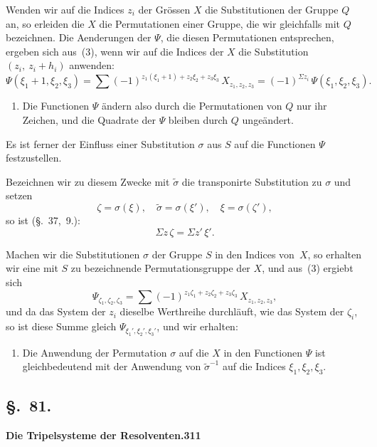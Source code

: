 \documentclass[12pt,a4paper]{article}
\begin{document}
Wenden wir auf die Indices $z_i$ der Gr\"ossen $X$ die Substitutionen der Gruppe $Q$ an, so erleiden die $X$ die Permutationen einer Gruppe, die wir gleichfalls mit $Q$ bezeichnen. Die Aenderungen der $\Psi$, die diesen Permutationen entsprechen, ergeben sich aus~(3), wenn wir auf die Indices der $X$ die Substitution $(z_i,\ z_i+h_i)$ anwenden:
\begin{equation}
\tag{4}
\Psi(\xi_1+1,\xi_2,\xi_3) = \sum (-1)^{z_1(\xi_1+1)+z_2\xi_2+z_3\xi_3}\,X_{z_1,z_2,z_3} = (-1)^{\Sigma z_i}\,\Psi(\xi_1,\xi_2,\xi_3).
\end{equation}

\begin{enumerate}
\item[1.] Die Functionen $\Psi$ \"andern also durch die Permutationen von $Q$ nur ihr Zeichen, und die Quadrate der $\Psi$ bleiben durch $Q$ unge\"andert.
\end{enumerate}

Es ist ferner der Einfluss einer Substitution $\sigma$ aus $S$ auf die Functionen $\Psi$ festzustellen.

Bezeichnen wir zu diesem Zwecke mit $\tilde\sigma$ die transponirte Substitution zu $\sigma$ und setzen
\begin{equation}
\tag{5}
\zeta = \sigma(\xi),\quad \tilde\sigma = \sigma(\xi'),\quad \xi = \sigma(\zeta'),
\end{equation}
so ist (\S.~37,~9.):
\begin{equation}
\tag{6}
\Sigma z\,\zeta = \Sigma z'\,\xi'.
\end{equation}

Machen wir die Substitutionen $\sigma$ der Gruppe $S$ in den Indices von~$X$, so erhalten wir eine mit $S$ zu bezeichnende Permutationsgruppe der $X$, und aus~(3) ergiebt sich
\[
\Psi_{\zeta_1,\zeta_2,\zeta_3} = \sum (-1)^{z_1\zeta_1+z_2\zeta_2+z_3\zeta_3}\,X_{z_1,z_2,z_3},
\]
und da das System der $z_i$ dieselbe Werthreihe durchl\"auft, wie das System der $\zeta_i$, so ist diese Summe gleich $\Psi_{\xi_1',\xi_2',\xi_3'}$, und wir erhalten:
\begin{enumerate}
\item[2.] Die Anwendung der Permutation $\sigma$ auf die $X$ in den Functionen $\Psi$ ist gleichbedeutend mit der Anwendung von $\tilde\sigma^{-1}$ auf die Indices $\xi_1,\xi_2,\xi_3$.
\end{enumerate}

\subsection*{\S.~81.}
\textbf{Die Tripelsysteme der Resolventen.}\hfill\textbf{311}\\[4pt]
\end{document}

